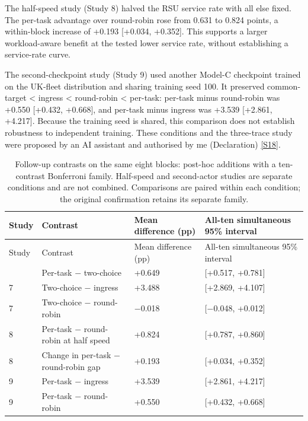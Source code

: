 \documentclass[12pt,a4paper]{article}
\begin{document}
The half-speed study (Study 8) halved the RSU service rate with all else fixed. The per-task advantage over round-robin rose from 0.631 to 0.824 points, a within-block increase of +0.193 [+0.034, +0.352]. This supports a larger workload-aware benefit at the tested lower service rate, without establishing a service-rate curve.

The second-checkpoint study (Study 9) used another Model-C checkpoint trained on the UK-fleet distribution and sharing training seed 100. It preserved common-target < ingress < round-robin < per-task: per-task minus round-robin was +0.550 [+0.432, +0.668], and per-task minus ingress was +3.539 [+2.861, +4.217]. Because the training seed is shared, this comparison does not establish robustness to independent training. These conditions and the three-trace study were proposed by an AI assistant and authorised by me (Declaration) \hyperref[source-s18]{[S18]}.

\begingroup
\singlespacing\footnotesize\setlength{\tabcolsep}{3pt}
\renewcommand{\thetable}{7a}
\begin{xltabular}{\textwidth}{@{}YYYY@{}}
\caption[Declared follow-up contrasts]{Follow-up contrasts on the same eight blocks: post-hoc additions with a ten-contrast Bonferroni family. Half-speed and second-actor studies are separate conditions and are not combined. Comparisons are paired within each condition; the original confirmation retains its separate family.}\label{tab:7a} \\
\toprule
Study & Contrast & Mean difference (pp) & All-ten simultaneous 95\% interval \\
\midrule\endfirsthead
\toprule
Study & Contrast & Mean difference (pp) & All-ten simultaneous 95\% interval \\
\midrule\endhead
\bottomrule{} & Per-task \ensuremath{-} two-choice & +0.649 & [+0.517, +0.781] \\
7 & Two-choice \ensuremath{-} ingress & +3.488 & [+2.869, +4.107] \\
7 & Two-choice \ensuremath{-} round-robin & \ensuremath{-}0.018 & [\ensuremath{-}0.048, +0.012] \\
8 & Per-task \ensuremath{-} round-robin at half speed & +0.824 & [+0.787, +0.860] \\
8 & Change in per-task \ensuremath{-} round-robin gap & +0.193 & [+0.034, +0.352] \\
9 & Per-task \ensuremath{-} ingress & +3.539 & [+2.861, +4.217] \\
9 & Per-task \ensuremath{-} round-robin & +0.550 & [+0.432, +0.668] \\
\end{xltabular}
\endgroup
\end{document}
